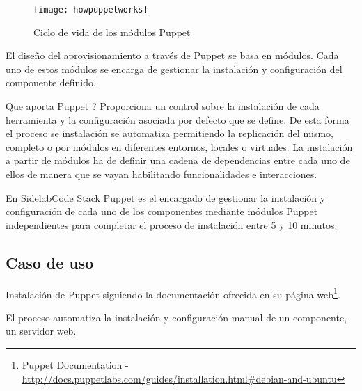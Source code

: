 \begin{figure}[H]
    \centering
    \texttt{[image: howpuppetworks]}
    \caption{Ciclo de vida de los módulos Puppet}
    \label{fig:howpuppetworks}
\end{figure}

\par El diseño del aprovisionamiento a través de Puppet se basa en módulos. Cada uno de estos módulos se encarga de gestionar la instalación y configuración del componente definido.

\par Que aporta Puppet ? Proporciona un control sobre la instalación de cada herramienta y la configuración asociada por defecto que se define. De esta forma el proceso se instalación se automatiza permitiendo la replicación del mismo, completo o por módulos en diferentes entornos, locales o virtuales. La instalación a partir de módulos ha de definir una cadena de dependencias entre cada uno de ellos de manera que se vayan habilitando funcionalidades e interacciones.

\par En SidelabCode Stack Puppet es el encargado de gestionar la instalación y configuración de cada uno de los componentes mediante módulos Puppet independientes para completar el proceso de instalación entre 5 y 10 minutos.

\subsection{Caso de uso}
\label{sub:puppet-caso-de-uso}

\par Instalación de Puppet siguiendo la documentación ofrecida en su página web\footnote{Puppet Documentation - \url{http://docs.puppetlabs.com/guides/installation.html\#debian-and-ubuntu}}.

\par El proceso automatiza la instalación y configuración manual de un componente, un servidor web.

